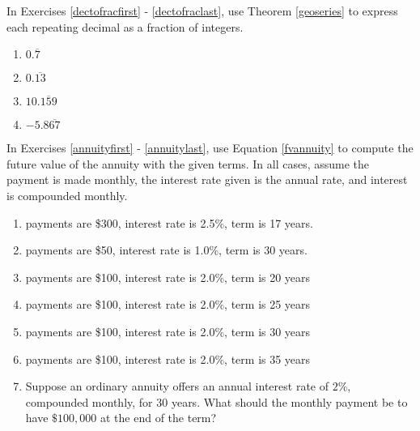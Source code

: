 \documentclass{ximera}
\begin{document}
\pagebreak

In Exercises \ref{dectofracfirst} - \ref{dectofraclast}, use Theorem \ref{geoseries} to express each repeating decimal as a fraction of integers.

\begin{multicols}{4}

\begin{enumerate}
\setcounter{enumi}{\value{HW}}
\item $0.\overline{7}$ \label{dectofracfirst}
\item $0.\overline{13}$
\item $10.\overline{159}$
\item $-5.8\overline{67}$ \label{dectofraclast}
\setcounter{HW}{\value{enumi}}
\end{enumerate}

\end{multicols}


In Exercises \ref{annuityfirst} - \ref{annuitylast}, use Equation \ref{fvannuity} to compute the future value of the annuity with the given terms.  In all cases, assume the payment is made monthly, the interest rate given is the annual rate, and interest is compounded monthly.

\begin{enumerate}
\setcounter{enumi}{\value{HW}}

\item payments are \$300, interest rate is 2.5\%, term is 17 years. \label{annuityfirst}

\item payments are \$50, interest rate is 1.0\%,  term is 30 years. 

\item payments are \$100, interest rate is 2.0\%, term is 20 years 

\item  payments are \$100, interest rate is 2.0\%,  term is  25 years

\item  payments are \$100, interest rate is 2.0\%,  term is  30 years


\item  payments are \$100, interest rate is 2.0\%,  term is  35 years
\label{annuitylast}   
 
\item Suppose an ordinary annuity offers an annual interest rate of $2 \%$, compounded monthly, for 30 years. What should the monthly payment be to have $\$100,\!000$ at the end of the term? 

\setcounter{HW}{\value{enumi}}
\end{enumerate}
\end{document}
